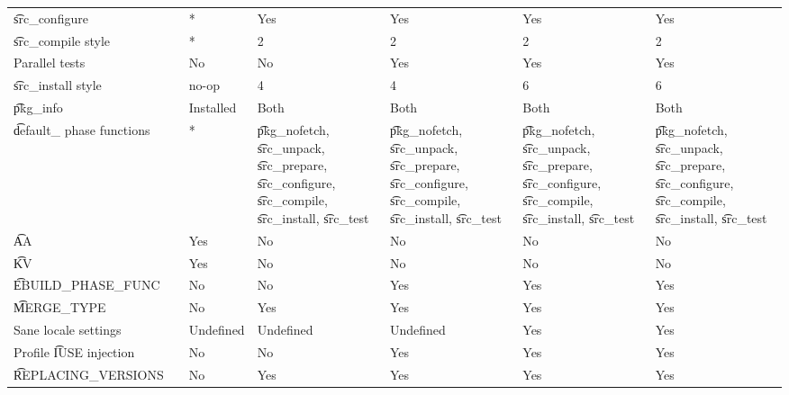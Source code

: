 \begin{landscape}
\begin{longtable}{llP{7.5em}P{7.5em}P{7.5em}P{7.5em}P{7.5em}}
\t{src_configure} &  &
    * & Yes & Yes & Yes & Yes \\

\t{src_compile} style &  &
    * & 2 & 2 & 2 & 2 \\

Parallel tests &  &
    No & No & Yes & Yes & Yes \\

\t{src_install} style &  &
    no-op & 4 & 4 & 6 & 6 \\

\t{pkg_info} &  &
    Installed & Both & Both & Both & Both \\

\t{default_} phase functions &  &
    * &
    \t{pkg_nofetch}, \t{src_unpack}, \t{src_prepare}, \t{src_configure},
        \t{src_compile}, \t{src_install}, \t{src_test} &
    \t{pkg_nofetch}, \t{src_unpack}, \t{src_prepare}, \t{src_configure},
        \t{src_compile}, \t{src_install}, \t{src_test} &
    \t{pkg_nofetch}, \t{src_unpack}, \t{src_prepare}, \t{src_configure},
        \t{src_compile}, \t{src_install}, \t{src_test} &
    \t{pkg_nofetch}, \t{src_unpack}, \t{src_prepare}, \t{src_configure},
        \t{src_compile}, \t{src_install}, \t{src_test} \\

\t{AA} &  &
    Yes & No & No & No & No \\

\t{KV} &  &
    Yes & No & No & No & No \\

\t{EBUILD_PHASE_FUNC} &  &
    No & No & Yes & Yes & Yes \\

\t{MERGE_TYPE} &  &
    No & Yes & Yes & Yes & Yes \\

Sane locale settings &  &
    Undefined & Undefined & Undefined & Yes & Yes \\

Profile \t{IUSE} injection &  &
    No & No & Yes & Yes & Yes \\

\t{REPLACING_VERSIONS} &  &
    No & Yes & Yes & Yes & Yes \\


\end{longtable}
\end{landscape}
